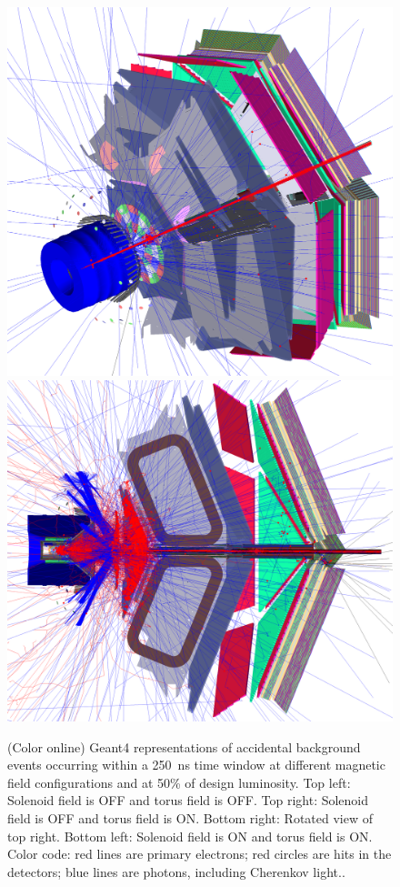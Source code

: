 \documentclass[final,3p,twocolumn]{elsarticle}
\begin{document}
\begin{figure}[htbp!]
{}
\vspace{0.3cm}
\centerline{
	\includegraphics[width=1.0\columnwidth, height=1.0\columnwidth]{FullSolenoidFullTorus.png}
	\includegraphics[width=1.0\columnwidth, height=1.0\columnwidth]{NoSolenoidFullTorusCut1.png}
}
\caption{(Color online) Geant4 representations of accidental background events occurring within a 250~ns time window at
  different magnetic field configurations and at 50\% of design luminosity. Top left: Solenoid field is OFF and
  torus field is OFF. Top right: Solenoid field is OFF and torus field is ON. Bottom right: Rotated view of top right.
  Bottom left: Solenoid field is ON and torus field is ON. Color code: red lines are
  primary electrons; red circles are hits in the detectors; blue lines are photons, including Cherenkov light..}
  
\label{gemc-event}
\end{figure}
\end{document}
